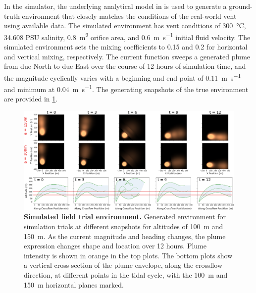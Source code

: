 In the simulator, the underlying analytical model in \PHUMES is used to generate a ground-truth environment that closely matches the conditions of the real-world vent using available data. The simulated environment has vent conditions of \SI{300}{\celsius}, 34.608 PSU salinity, \SI{0.8}{\meter\squared} orifice area, and \SI{0.6}{\meter\per\second} initial fluid velocity. The simulated environment sets the mixing coefficients to 0.15 and 0.2 for horizontal and vertical mixing, respectively. The current function sweeps a generated plume from due North to due East over the course of 12 hours of simulation time, and the magnitude cyclically varies with a beginning and end point of \SI{0.11}{\meter\per\second} and minimum at \SI{0.04}{\meter\per\second}. The generating snapshots of the true environment are provided in \cref{fig:sim_env}.

\begin{figure}[h!]
    \centering
    \includegraphics[width=1\columnwidth]{figures/sim_env.png}
    \caption{\textbf{Simulated field trial environment.} Generated environment for simulation trials at different snapshots for altitudes of \SI{100}{\meter} and \SI{150}{\meter}. As the current magnitude and heading changes, the plume expression changes shape and location over 12 hours. Plume intensity is shown in orange in the top plots. The bottom plots show a vertical cross-section of the plume envelope, along the crossflow direction, at different points in the tidal cycle, with the \SI{100}{\meter} and \SI{150}{\meter} horizontal planes marked.}
    \label{fig:sim_env}
\end{figure}

